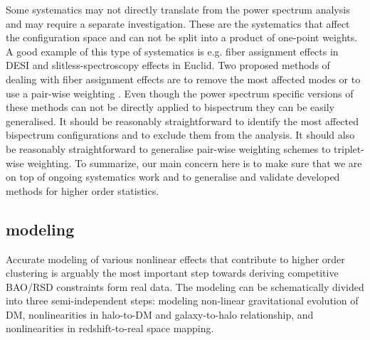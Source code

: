 Some systematics may not directly translate from the power spectrum analysis
and may require a separate investigation. These are the systematics that affect
the configuration space and can not be split into a product of one-point
weights. A good example of this type of systematics is e.g. fiber assignment
effects in DESI and slitless-spectroscopy effects in Euclid. Two
proposed methods of dealing with fiber assignment effects are to remove the
most affected modes or to use a pair-wise weighting \cite{2017JCAP...04..008P,2018MNRAS.481.2338B,2017JCAP...03..001B,2017MNRAS.472.1106B,2017MNRAS.472L..40P,2018arXiv181000323Y,2018arXiv180907355S}. Even though the power
spectrum specific versions of these methods can not be directly applied to
bispectrum they can be easily generalised. It should be reasonably
straightforward to identify the most affected bispectrum configurations and to
exclude them from the analysis. It should also be reasonably straightforward to
generalise pair-wise weighting schemes to triplet-wise weighting. To summarize,
our main concern here is to make sure that we are on top of ongoing systematics
work and to generalise and validate developed methods for higher order
statistics.

\subsection*{modeling}

Accurate modeling of various nonlinear effects that contribute to higher order
clustering is arguably the most important step towards deriving competitive
BAO/RSD constraints form real data. The modeling can be schematically divided
into three semi-independent steps: modeling non-linear gravitational evolution
of DM, nonlinearities in halo-to-DM and galaxy-to-halo relationship, and
nonlinearities in redshift-to-real space mapping.

